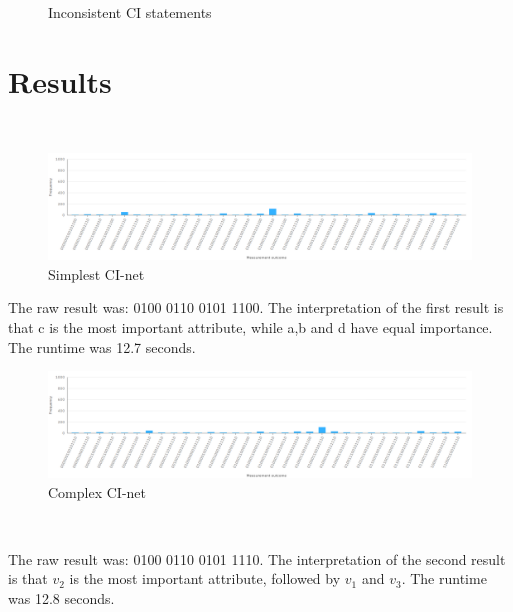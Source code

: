 \documentclass[12pt]{article}
\begin{document}
\begin{flushleft}
\begin{figure}
\begin{center}
\end{center}
\caption{Inconsistent CI statements}
\end{figure}

\section{Results}
\ \\
\begin{figure}[h!]
\includegraphics[width=\linewidth]{chart1.png}
\caption{Simplest CI-net}
\label{cinet:simple}
\end{figure}
\par{The raw result was: 0100 0110 0101 1100.
The interpretation of the first result is that c is the most important attribute, while a,b and d have equal importance.\\
The runtime was 12.7 seconds.}
\ \\
\begin{figure}[h!]
\includegraphics[width=\linewidth]{chart2.png}
\caption{Complex CI-net}
\label{cinet:complex}
\end{figure}
\ \\
\par{The raw result was: 0100 0110 0101 1110.
The interpretation of the second result is that $v_2$ is the most important attribute, followed by $v_1$ and $v_3$. The runtime was 12.8 seconds.}


\end{flushleft}
\end{document}
